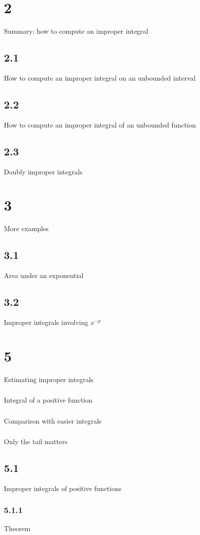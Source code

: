\section{2}{Summary: how to compute an improper integral}
\subsection{2.1}{How to compute an improper integral on an unbounded interval}
\subsection{2.2}{How to compute an improper integral of an unbounded function}
\subsection{2.3}{Doubly improper integrals}
\section{3}{More examples}
\subsection{3.1}{Area under an exponential}
\subsection{3.2}{Improper integrals involving $x^{-p}$}

\section{5}{Estimating improper integrals}
\subsubsection{}{Integral of a positive function}
\subsubsection{}{Comparison with easier integrals}
\subsubsection{}{Only the tail matters}
\subsection{5.1}{Improper integrals of positive functions}
\subsubsection{5.1.1}{Theorem}
